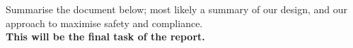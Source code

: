 Summarise the document below; most likely a summary of our design, and our approach to maximise safety and compliance.\\

\textbf{This will be the final task of the report.}